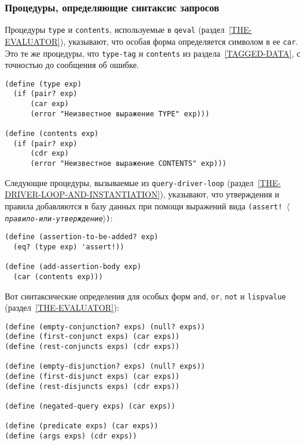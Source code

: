 \subsubsection{Процедуры, определяющие синтаксис запросов}
\label{QUERY-SYNTAX-PROCEDURES}%

Процедуры {\tt type} и {\tt contents},
используемые в {\tt qeval}
(раздел~\ref{THE-EVALUATOR}), указывают, что особая форма
определяется символом в ее {\tt car}.  Это те же процедуры, что
{\tt type-tag} и {\tt contents} из 
раздела~\ref{TAGGED-DATA}, с точностью до сообщения об ошибке.

\begin{Verbatim}[fontsize=\small]
(define (type exp)
  (if (pair? exp)
      (car exp)
      (error "Неизвестное выражение TYPE" exp)))

(define (contents exp)
  (if (pair? exp)
      (cdr exp)
      (error "Неизвестное выражение CONTENTS" exp)))
\end{Verbatim}

Следующие процедуры, вызываемые из
{\tt query-driver-loop} 
(раз\-дел~\ref{THE-DRIVER-LOOP-AND-INSTANTIATION}), указывают, что
утверждения и правила добавляются в базу данных при помощи выражений
вида {\tt (assert! \textit{$\langle$правило-или-утверждение$\rangle$})}:
{\sloppy

}

\begin{Verbatim}[fontsize=\small]
(define (assertion-to-be-added? exp)
  (eq? (type exp) 'assert!))

(define (add-assertion-body exp)
  (car (contents exp)))
\end{Verbatim}

Вот синтаксические определения для особых форм
{\tt and}, {\tt or}, {\tt not} и
{\tt lisp\-value} (раздел~\ref{THE-EVALUATOR}):

\begin{Verbatim}[fontsize=\small]
(define (empty-conjunction? exps) (null? exps))
(define (first-conjunct exps) (car exps))
(define (rest-conjuncts exps) (cdr exps))

(define (empty-disjunction? exps) (null? exps))
(define (first-disjunct exps) (car exps))
(define (rest-disjuncts exps) (cdr exps))

(define (negated-query exps) (car exps))

(define (predicate exps) (car exps))
(define (args exps) (cdr exps))
\end{Verbatim}

